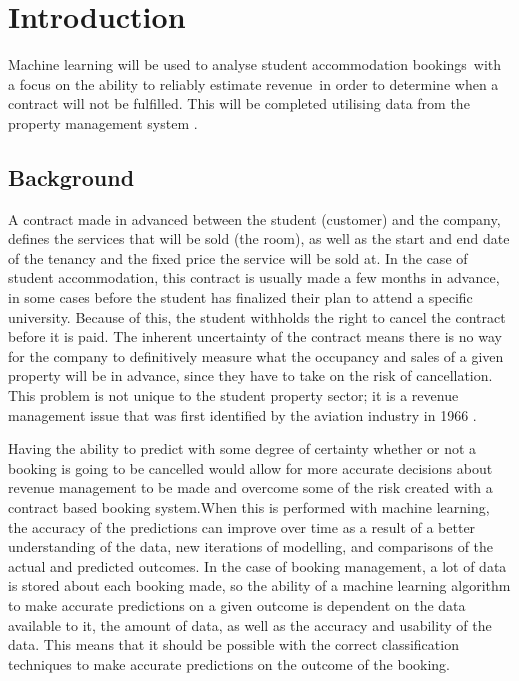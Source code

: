 \chapter{Introduction}

Machine learning will be used to analyse student accommodation bookings with a focus on the ability to reliably estimate revenue in order to determine when a contract will not be fulfilled. This will be completed utilising data from the property management system \cite{Jain2006IntellectualPerspective}.

\section{Background}

A contract made in advanced between the student (customer) and the company, defines the services that will be sold (the room), as well as the start and end date of the tenancy and the fixed price the service will be sold at. In the case of student accommodation, this contract is usually made a few months in advance, in some cases before the student has finalized their plan to attend a specific university. Because of this, the student withholds the right to cancel the contract before it is paid. The inherent uncertainty of the contract means there is no way for the company to definitively measure what the occupancy and sales of a given property will be in advance, since they have to take on the risk of cancellation. This problem is not unique to the student property sector; it is a revenue management issue that was first identified by the aviation industry in 1966 \cite{Chiang2007AnResearch}.

\vspace{5mm}

Having the ability to predict with some degree of certainty whether or not a booking is going to be cancelled would allow for more accurate decisions about revenue management to be made and overcome some of the risk created with a contract based booking system.When this is performed with machine learning, the accuracy of the predictions can improve over time as a result of a better understanding of the data, new iterations of modelling, and comparisons of the actual and predicted outcomes. In the case of booking management, a lot of data is stored about each booking made, so the ability of a machine learning algorithm to make accurate predictions on a given outcome is dependent on the data available to it, the amount of data, as well as the accuracy and usability of the data. This means that it should be possible with the correct classification techniques to make accurate predictions on the outcome of the booking.

